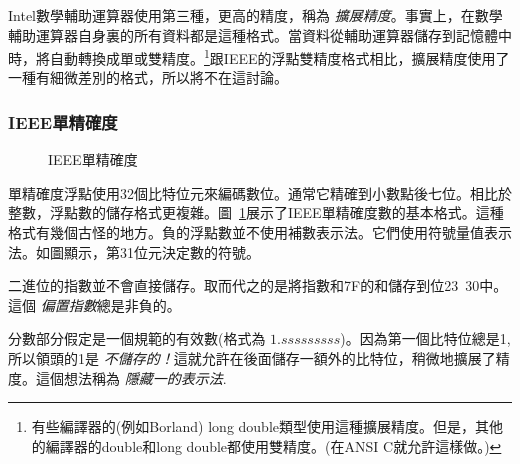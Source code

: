 Intel數學輔助運算器使用第三種，更高的精度，稱為
\emph{擴展精度}。事實上，在數學輔助運算器自身裏的所有資料都是這種格式。當資料從輔助運算器儲存到記憶體中時，將自動轉換成單或雙精度。\footnote{
有些編譯器的(例如Borland) {\code long double}類型使用這種擴展精度。但是，其他的編譯器的{\code double}和{\code long double}都使用雙精度。(在ANSI C就允許這樣做。)}跟IEEE的浮點雙精度格式相比，擴展精度使用了一種有細微差別的格式，所以將不在這討論。

\subsubsection{IEEE單精確度}

\begin{figure}[t]
\caption{IEEE單精確度\label{fig:IEEEsingle}}
\end{figure}

單精確度浮點使用32個比特位元來編碼數位。通常它精確到小數點後七位。相比於整數，浮點數的儲存格式更複雜。圖~\ref{fig:IEEEsingle}展示了IEEE單精確度數的基本格式。這種格式有幾個古怪的地方。負的浮點數並不使用補數表示法。它們使用符號量值表示法。如圖顯示，第31位元決定數的符號。

二進位的指數並不會直接儲存。取而代之的是將指數和7F的和儲存到位23~30中。這個
\emph{偏置指數}總是非負的。

分數部分假定是一個規範的有效數(格式為
$1.sssssssss$)。因為第一個比特位總是1,所以領頭的1是
\emph{不儲存的！}這就允許在後面儲存一額外的比特位，稍微地擴展了精度。這個想法稱為
\emph{隱藏一的表示法}.

